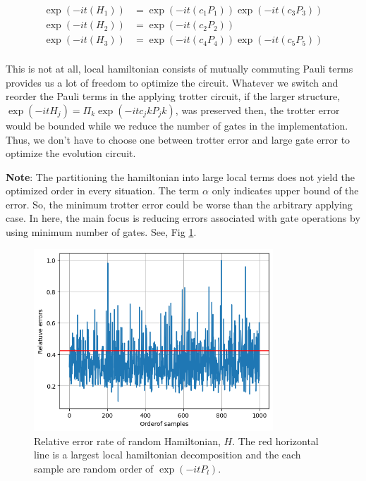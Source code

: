 \documentclass[a4paper,12pt]{article}
\begin{document}
\begin{align}
    \exp(- i t (H_1)) &= \exp(- i t (c_1 P_1)) \exp(- i t (c_3 P_3)) \\ 
    \exp(- i t (H_2)) &= \exp(- i t (c_2 P_2))\\
    \exp(- i t (H_3)) &= \exp(- i t (c_4 P_4)) \exp(- i t (c_5 P_5)) \\ 
\end{align}

This is not at all, local hamiltonian consists of mutually commuting Pauli terms provides us a lot of freedom
to optimize the circuit. 
Whatever we switch and reorder the Pauli terms in the applying trotter circuit,
if the larger structure, $\exp(-it H_j) = \Pi_k \exp(-it c_jk P_jk)$, was preserved then, 
the trotter error would be bounded while we reduce the number of gates in the implementation.
Thus, we don't have to choose one between trotter error and large gate error
to optimize the evolution circuit.

\textbf{Note}: The partitioning the hamiltonian into large local terms does not yield the optimized 
order in every situation. 
The term $\alpha$ only indicates upper bound of the error. So, the minimum trotter error could be 
worse than the arbitrary applying case. 
In here, the main focus is reducing errors associated with gate operations by using minimum number of gates.
See, Fig \ref{fig:evolve_error}.

\begin{figure}
        \centering
        \includegraphics[width=0.8\textwidth]{figures/error rates.png}
        \caption{
            Relative error rate of random Hamiltonian, $H$. 
            The red horizontal line is a largest local hamiltonian decomposition and the each sample are random order of $\exp(-i t P_l)$.
            }
            \label{fig:evolve_error}
\end{figure}
\end{document}
